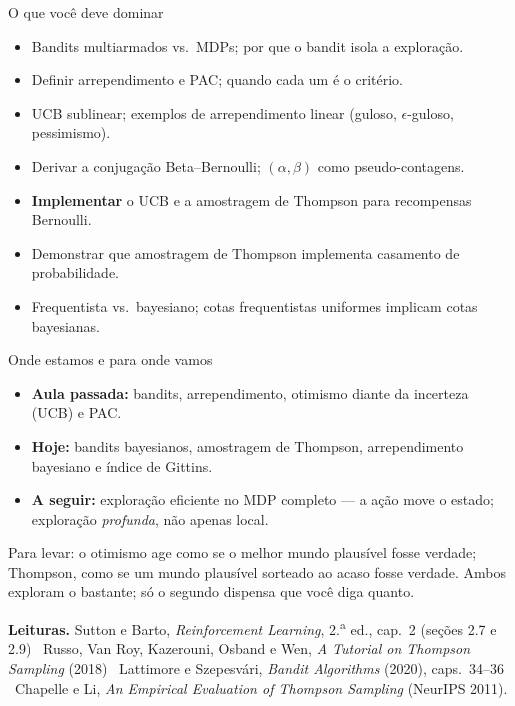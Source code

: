 \documentclass[aspectratio=169, 11pt]{beamer}
\begin{document}
\begin{frame}{O que você deve dominar}
  \begin{itemize}
    \item Bandits multiarmados vs.\ MDPs; por que o bandit isola a
          exploração.
    \item Definir arrependimento e PAC; quando cada um é o critério.
    \item UCB sublinear; exemplos de arrependimento linear (guloso,
          $\epsilon$-guloso, pessimismo).
    \item Derivar a conjugação Beta--Bernoulli; $(\alpha,\beta)$ como
          pseudo-contagens.
    \item \textbf{Implementar} o UCB e a amostragem de Thompson para
          recompensas Bernoulli.
    \item Demonstrar que amostragem de Thompson implementa casamento de
          probabilidade.
    \item Frequentista vs.\ bayesiano; cotas frequentistas uniformes
          implicam cotas bayesianas.
  \end{itemize}
\end{frame}

\begin{frame}{Onde estamos e para onde vamos}
  \begin{itemize}
    \item \textbf{Aula passada:} bandits, arrependimento, otimismo diante
          da incerteza (UCB) e PAC.
    \item \textbf{Hoje:} bandits bayesianos, amostragem de Thompson,
          arrependimento bayesiano e índice de Gittins.
    \item \textbf{A seguir:} exploração eficiente no MDP completo — a ação
          move o estado; exploração \emph{profunda}, não apenas local.
  \end{itemize}

  \begin{ideiabox}
    Para levar: \alert{o otimismo age como se o melhor mundo plausível
    fosse verdade; Thompson, como se um mundo plausível sorteado ao acaso
    fosse verdade}. Ambos exploram o bastante; só o segundo dispensa que
    você diga quanto.
  \end{ideiabox}

  \smallskip
  {\footnotesize\color{rlCinza}\textbf{Leituras.} Sutton e Barto,
  \emph{Reinforcement Learning}, 2.\textsuperscript{a} ed., cap.~2 (seções
  2.7 e 2.9) \textbullet\ Russo, Van Roy, Kazerouni, Osband e Wen,
  \emph{A Tutorial on Thompson Sampling} (2018) \textbullet\ Lattimore e
  Szepesvári, \emph{Bandit Algorithms} (2020), caps.~34--36 \textbullet\
  Chapelle e Li, \emph{An Empirical Evaluation of Thompson Sampling}
  (NeurIPS 2011).}
\end{frame}
\end{document}
